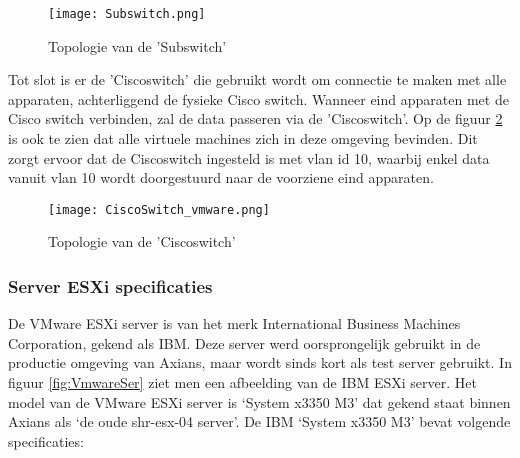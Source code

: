 \begin{figure}[H]
	\centering
	\texttt{[image: Subswitch.png]}
	\caption{Topologie van de 'Sub\textunderscore switch'}
	\label{fig:subswitch}
\end{figure}
\newpage
{}
\newline
Tot slot is er de 'Cisco\textunderscore switch' die gebruikt wordt om connectie te maken met alle apparaten, achterliggend de fysieke Cisco switch. Wanneer eind apparaten met de Cisco switch verbinden, zal de data passeren via de 'Cisco\textunderscore switch'. Op de figuur \ref{fig:Ciscoswitch} is ook te zien dat alle virtuele machines zich in deze omgeving bevinden. Dit zorgt ervoor dat de Cisco\textunderscore switch ingesteld is met vlan id 10, waarbij enkel data vanuit vlan 10 wordt doorgestuurd naar de voorziene eind apparaten.

\begin{figure}[H]
	\centering
	\texttt{[image: CiscoSwitch\_vmware.png]}
	\caption{Topologie van de 'Cisco\textunderscore switch'}
	\label{fig:Ciscoswitch}
\end{figure}

\subsubsection{Server ESXi specificaties}
De VMware ESXi server is van het merk International Business Machines Corporation, gekend als IBM. Deze server werd oorsprongelijk gebruikt in de productie omgeving van Axians, maar wordt sinds kort als test server gebruikt. In figuur \ref{fig:VmwareSer} ziet men een afbeelding van de IBM ESXi server.
\newline
\newline
Het model van de VMware ESXi server is ‘System x3350 M3’ dat gekend staat binnen Axians als ‘de oude shr-esx-04 server’. De IBM ‘System x3350 M3’ bevat volgende specificaties:



